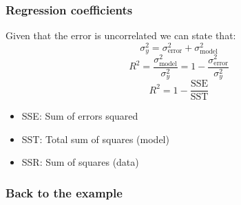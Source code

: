 \begin{frame}[fragile] 
  \frametitle{Regression coefficients}
  Given that the error is uncorrelated we can state that:
    \[
      \sigma^2_y = \sigma^2_\text{error}+\sigma^2_\text{model}
    \]
    \[
      R^2 = \frac{\sigma^2_\text{model}}{\sigma^2_y} = 1 - \frac{\sigma^2_\text{error}}{\sigma^2_y}
    \]
    \[
      R^2 = 1 - \frac{\text{SSE}}{\text{SST}}
    \]
    \begin{itemize}
      \item SSE: Sum of errors squared
      \item SST: Total sum of squares (model)
      \item SSR: Sum of squares (data)
   \end{itemize}
\end{frame}


\begin{frame}[fragile] 
  \frametitle{Back to the example}
\end{frame}

